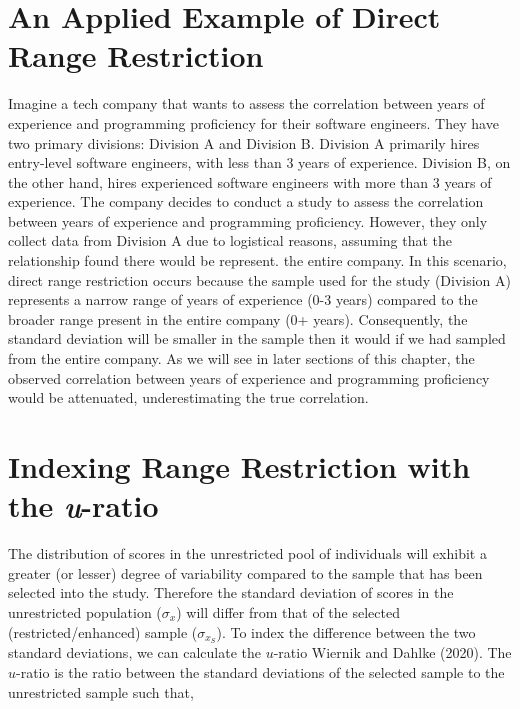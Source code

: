 \documentclass[
  letterpaper,
  DIV=11,
  numbers=noendperiod]{scrreprt}
\begin{document}
\hypertarget{an-applied-example-of-direct-range-restriction}{%
\section{An Applied Example of Direct Range
Restriction}\label{an-applied-example-of-direct-range-restriction}}

Imagine a tech company that wants to assess the correlation between
years of experience and programming proficiency for their software
engineers. They have two primary divisions: Division A and Division B.
Division A primarily hires entry-level software engineers, with less
than 3 years of experience. Division B, on the other hand, hires
experienced software engineers with more than 3 years of experience. The
company decides to conduct a study to assess the correlation between
years of experience and programming proficiency. However, they only
collect data from Division A due to logistical reasons, assuming that
the relationship found there would be represent. the entire company. In
this scenario, direct range restriction occurs because the sample used
for the study (Division A) represents a narrow range of years of
experience (0-3 years) compared to the broader range present in the
entire company (0+ years). Consequently, the standard deviation will be
smaller in the sample then it would if we had sampled from the entire
company. As we will see in later sections of this chapter, the observed
correlation between years of experience and programming proficiency
would be attenuated, underestimating the true correlation.

\hypertarget{indexing-range-restriction-with-the-u-ratio}{%
\section{\texorpdfstring{Indexing Range Restriction with the
\emph{u}-ratio}{Indexing Range Restriction with the u-ratio}}\label{indexing-range-restriction-with-the-u-ratio}}

The distribution of scores in the unrestricted pool of individuals will
exhibit a greater (or lesser) degree of variability compared to the
sample that has been selected into the study. Therefore the standard
deviation of scores in the unrestricted population (\(\sigma_x\)) will
differ from that of the selected (restricted/enhanced) sample
(\(\sigma_{x_{S}}\)). To index the difference between the two standard
deviations, we can calculate the \(u\)-ratio Wiernik and Dahlke (2020).
The \(u\)-ratio is the ratio between the standard deviations of the
selected sample to the unrestricted sample such that,
\end{document}
